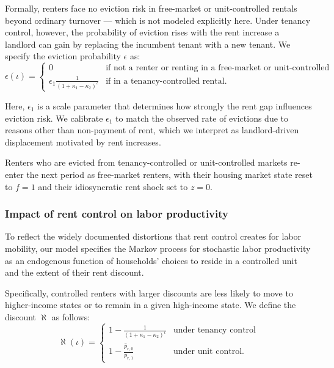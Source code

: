 \documentclass[parskip=full]{article}
\begin{document}
Formally, renters face no eviction risk in free-market or unit-controlled rentals beyond ordinary turnover — which is not modeled explicitly here. Under tenancy control, however, the probability of eviction rises with the rent increase a landlord can gain by replacing the incumbent tenant with a new tenant. We specify the eviction probability $\epsilon$ as:
\begin{equation}\label{eq:eviction}
\epsilon(\iota)=
\begin{cases}
0 & \text{if not a renter or renting in a free-market or unit-controlled rental} \\ \epsilon_1 \frac{1}{\left(1 + \kappa_1 - \kappa_2 \right)^{\iota}} & \text{if in a tenancy-controlled rental}.
\end{cases}
\end{equation}

\noindent Here, $\epsilon_1$ is a scale parameter that determines how strongly the rent gap influences eviction risk. We calibrate $\epsilon_1$ to match the observed rate of evictions due to reasons other than non-payment of rent, which we interpret as landlord-driven displacement motivated by rent increases.

Renters who are evicted from tenancy-controlled or unit-controlled markets re-enter the next period as free-market renters, with their housing market state reset to $f=1$ and their idiosyncratic rent shock set to $z=0$.

\subsubsection{Impact of rent control on labor productivity}

To reflect the widely documented distortions that rent control creates for labor mobility, our model specifies the Markov process for stochastic labor productivity as an endogenous function of households’ choices to reside in a controlled unit and the extent of their rent discount.

Specifically, controlled renters with larger discounts are less likely to move to higher-income states or to remain in a given high-income state. We define the discount $\aleph$ as follows:
\begin{equation}\label{eq:discount}
\aleph(\iota)=\begin{cases}
1-\frac{1}{\left(1+\kappa_1-\kappa_2 \right)^{\iota}} & \text{under tenancy control} \\[8pt]
1-\frac{\hat{p}_{r,0}}{\overline{p}_{r,1}} & \text{under unit control}.
\end{cases}
\end{equation}
\end{document}
